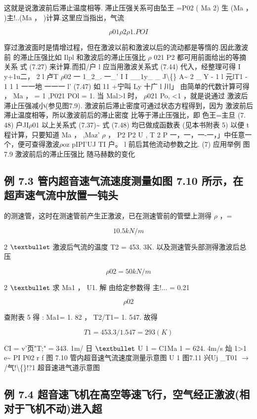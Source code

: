 这就是说激波前后滞止温度相等. 滞止压强关系可由坠王 =P02 ( Ma 2) 生 (Ma ， )主!..(Ma ， )计算.这里应当指出，气流

\[\rho 01\rho 2\rho 1 . POI\]

穿过激波面时是情增过程，但在激波以前和激波以后的流动都是等惰的.因此激波前 的滞止压强比如 Ilpl 和激波后的滞止压强比 $\rho$ 021 P2 都可用前面给出的等摘关系 式 (7.27) 来计算.而扣/户 l 应当用激波关系式 (7.44) 代入，经整理可得 I y+1u二， 2 l 卢T $\rho$02 一 1\_2\_. 一\_' I I \_\_1y\_ \_ J\textbackslash\{\} A\textasciitilde{} 2 \_ Y - 1 l 元lT1 - 1 1 1 一一地 一一一 l' (7.47) 如 11 +宁叫 Ly 十广 l 川」 由简单的代数计算可得 ， Ma ， = 1 ,P021 POl = 1. 当 Mal>l 时， $\rho$021 Po, <1 ，就是说通过 激波后滞止压强减小(参见图7.9). 激波前后滞止密度可通过状态方程得到，因为 激波前后滞止温度相等，所以激波前后的滞止密度 比等于滞止压强比，即 色王=主旦 (7. 48) 户JI$\rho$01 以上关系式 (7.37)\textasciitilde{} 式 (7.48) 均已做成函数表 (见本书附表 5) 以便 t 程计算，只要知道 Ma ， ,Maz' $\rho$ ， P2 P2 U , T 2 P 一，一，一-一，」中任意一个，便可查得激波$\rho$oz pIPI'UJ TI 户。 l 前后其他流动参数之比. (7) 应用举例 图7.9 激波前后的滞止压强比 随马赫数的变化

\subsection*{例 7.3  管内超音速气流速度测量如图 7.10 所示，在超声速气流中放置一钝头}

的测速管，这时在测速管前产生正激波，已在测速管前的管壁上测得 $\rho$ ，=

\[10. 5kN/m\]

2 ${\rm •}$ 激波后气流的温度 T2 = 453. 3K. 以及测速管头部测得激波后总压

\[\rho 02 =50kN/m\]

2 ${\rm •}$ 求 Ma1 ， U1. 解 由给定参数得 主!... = 0.21

\[\rho 02\]

查附表 5 得 : Ma1= 1. 82 ， T2/T1= 1. 547. 故得

\[T1 = 453.3/1.547 = 293(K)\]

CI = v'页"T;" = 343. 1m/ 日 ${\rm •}$ U 1 = C1Ma 1 = 624. 4m/s 灿 1>1 e\textasciitilde{} PI P02 r f 图 7.10 管内超音速气流速度测量示意图 U 1 图7.11 兴Uj \_T01 $\rightarrow$/气!\textbackslash\{\}!?1 超音速进气道示意图

\subsection*{例 7.4  超音速飞机在高空等速飞行，空气经正激波(相对于飞机不动)进入超}

